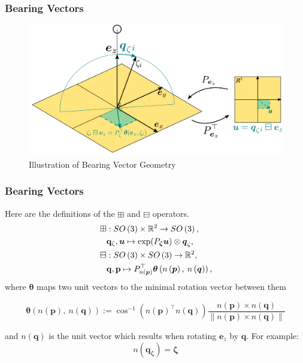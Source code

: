 \documentclass{beamer}
\begin{document}
\begin{frame}
\frametitle{Bearing Vectors}
\begin{figure}
\begin{centering}
\includegraphics[width=\columnwidth]{figures/unit_vector_picture}
\par\end{centering}
\caption{Illustration of Bearing Vector Geometry}
\end{figure}
\end{frame}

\begin{frame}
\frametitle{Bearing Vectors}
 Here are the definitions of the $\boxplus$ and $\boxminus$
operators.
\begin{align}
\boxplus & :SO\left(3\right)\times\mathbb{R}^{2}\rightarrow SO\left(3\right),\\
 & {\bf q_{\zeta}},\boldsymbol{u}\mapsto\exp(P_{\boldsymbol{\zeta}}\boldsymbol{u})\otimes\boldsymbol{q}_{\zeta},\\
\boxminus & :SO\left(3\right)\times SO\left(3\right)\rightarrow\mathbb{R}^{2},\\
 & {\bf q},{\bf p}\mapsto P_{n\left(\boldsymbol{p}\right)}^{\top}\boldsymbol{\theta}\left(n\left(\boldsymbol{p}\right),\:n\left(\boldsymbol{q}\right)\right),
\end{align}
where $\boldsymbol{\theta}$ maps two unit vectors to the minimal
rotation vector between them

\begin{equation}
\boldsymbol{\theta}\left(n\left(\boldsymbol{p}\right),\:n\left(\boldsymbol{q}\right)\right):=\cos^{-1}\left(n\left(\boldsymbol{p}\right)^{\top}n\left(\boldsymbol{q}\right)\right)\dfrac{n\left(\boldsymbol{p}\right)\times n\left(\boldsymbol{q}\right)}{\lVert n\left(\boldsymbol{p}\right)\times n\left(\boldsymbol{q}\right)\rVert}
\end{equation}


and $n\left(\boldsymbol{q}\right)$ is the unit vector which results
when rotating $\boldsymbol{e}_{z}$ by $\boldsymbol{q}$. For example:
\begin{equation}
n(\boldsymbol{q_{\zeta}})=\boldsymbol{\zeta}
\end{equation}
\end{frame}
\end{document}

